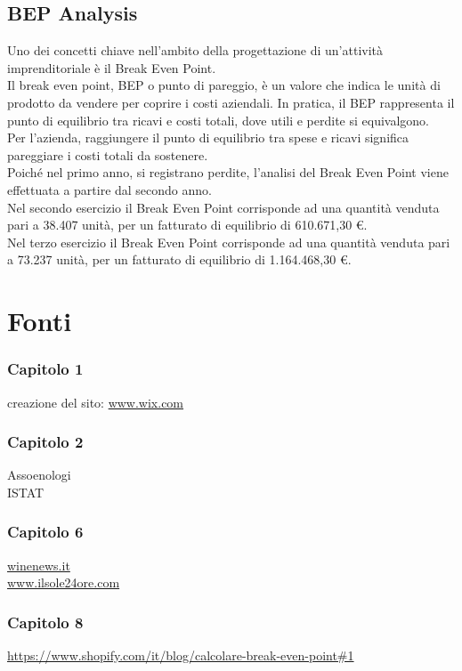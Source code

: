 \documentclass[12pt, a4paper]{article}
\newcommand{\meskip}{\medskip \\}
\newcommand{\bskip}{\bigskip \\}
\begin{document}
\subsection{BEP Analysis}
Uno dei concetti chiave nell'ambito della progettazione di un'attività imprenditoriale è il Break Even Point.\meskip
Il break even point, BEP o punto di pareggio, è un valore che indica le unità di prodotto da vendere per coprire i costi aziendali. In pratica, il BEP rappresenta il punto di equilibrio tra ricavi e costi totali, dove utili e perdite si equivalgono.\meskip
Per l'azienda, raggiungere il punto di equilibrio tra spese e ricavi significa pareggiare i costi totali da sostenere. \meskip
Poiché nel primo anno,  si registrano perdite, l'analisi del Break Even Point viene effettuata a partire dal secondo anno.\bskip
Nel secondo esercizio il Break Even Point corrisponde ad una quantità venduta pari a 38.407 unità, per un fatturato di equilibrio di 610.671,30 €.\meskip
Nel terzo esercizio il Break Even Point corrisponde ad una quantità venduta pari a 73.237 unità, per un fatturato di equilibrio di 1.164.468,30 €.

\newpage
\section{Fonti}
\subsubsection*{Capitolo 1}
creazione del sito: \url{www.wix.com}

\subsubsection*{Capitolo 2}
Assoenologi\\
ISTAT

\subsubsection*{Capitolo 6}
\url{winenews.it}\\
\url{www.ilsole24ore.com}

\subsubsection*{Capitolo 8}
\url{https://www.shopify.com/it/blog/calcolare-break-even-point#1}
\end{document}
